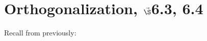 


%

%
%

\section{{Orthogonalization, $\vec\S$6.3, 6.4}}%
% 

%
\thispagestyle{fancy}

Recall from previously:

